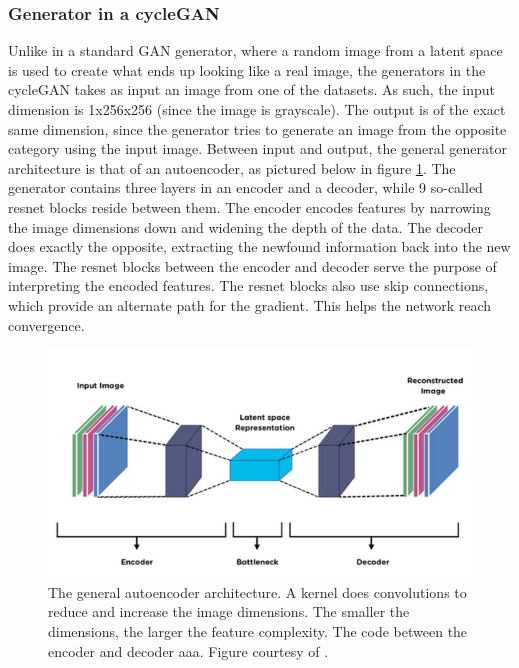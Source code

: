 \documentclass[12pt, fleqn, titlepage]{article}
\begin{document}
\subsubsection{Generator in a cycleGAN}
Unlike in a standard GAN generator, where a random image from a latent space is used to create what ends up looking like a real image, the generators in the cycleGAN takes as input an image from one of the datasets. As such, the input dimension is 1x256x256 (since the image is grayscale). The output is of the exact same dimension, since the generator tries to generate an image from the opposite category using the input image. Between input and output, the general generator architecture is that of an autoencoder, as pictured below in figure \ref{fig:autoencoder}. The generator contains three layers in an encoder and a decoder, while 9 so-called resnet blocks reside between them. The encoder encodes features by narrowing the image dimensions down and widening the depth of the data. The decoder does exactly the opposite, extracting the newfound information back into the new image. The resnet blocks between the encoder and decoder serve the purpose of interpreting the encoded features. The resnet blocks also use skip connections, which provide an alternate path for the gradient. This helps the network reach convergence.

\begin{figure}[H]
	\centering
	\includegraphics[width=0.7\linewidth]{imgs/autoencoder}
	\caption{The general autoencoder architecture. A kernel does convolutions to reduce and increase the image dimensions. The smaller the dimensions, the larger the feature complexity. The code between the encoder and decoder aaa. Figure courtesy of \cite{autoencoder}.} %
	\label{fig:autoencoder}
\end{figure}
\end{document}
